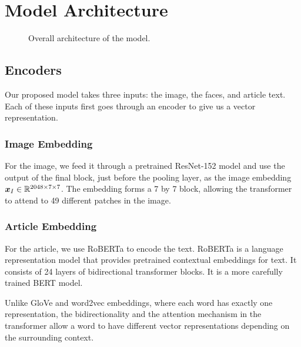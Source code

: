

\section{Model Architecture}

\begin{figure*}[t]
   \begin{center}
   \fbox{\rule{0pt}{2in} \rule{.9\linewidth}{0pt}}
   \end{center}
      \caption{Overall architecture of the model.}
   \label{fig:short}
\end{figure*}

\subsection{Encoders}

Our proposed model takes three inputs: the image, the faces, and article text.
Each of these inputs first goes through an encoder to give us a vector
representation.

\subsubsection{Image Embedding}

For the image, we feed it through a pretrained ResNet-152 model
\cite{He2016ResNet} and use the output of the final block, just before the
pooling layer, as the image embedding $\bm{x}_I \in \mathbb{R}^{2048 \times 7
\times 7}$. The embedding forms a 7 by 7 block, allowing the transformer to
attend to 49 different patches in the image.

\subsubsection{Article Embedding}

For the article, we use RoBERTa \cite{Liu2019RoBERTaAR} to encode the text.
RoBERTa is a language representation model that provides pretrained contextual
embeddings for text. It consists of 24 layers of bidirectional transformer
blocks. It is a more carefully trained BERT \cite{Devlin2019BERT} model.

Unlike GloVe \cite{Pennington2014Glove} and word2vec
\cite{Mikolov2013DistributedRO} embeddings, where each word has exactly one
representation, the bidirectionality and the attention mechanism in the
transformer allow a word to have different vector representations depending on
the surrounding context.

